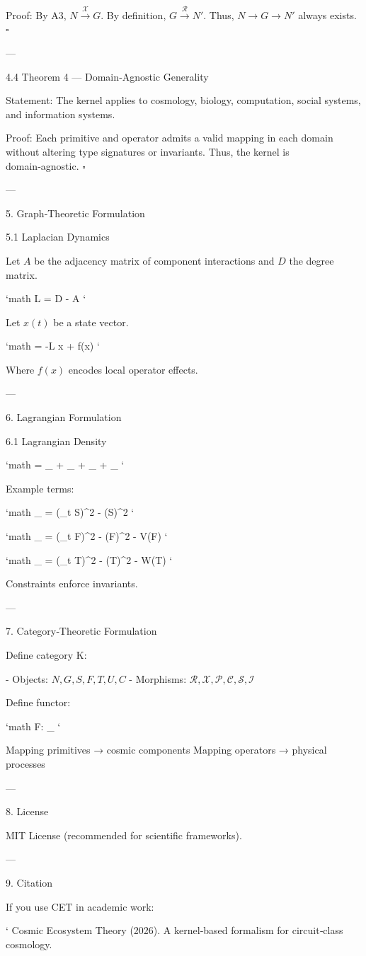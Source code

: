 Proof:  
By A3, \(N \xrightarrow{\mathcal{X}} G\).  
By definition, \(G \xrightarrow{\mathcal{R}} N'\).  
Thus, \(N \rightarrow G \rightarrow N'\) always exists.  
\(\square\)

---

4.4 Theorem 4 — Domain‑Agnostic Generality

Statement:  
The kernel applies to cosmology, biology, computation, social systems, and information systems.

Proof:  
Each primitive and operator admits a valid mapping in each domain without altering type signatures or invariants.  
Thus, the kernel is domain‑agnostic.  
\(\square\)

---

5. Graph‑Theoretic Formulation

5.1 Laplacian Dynamics

Let \(A\) be the adjacency matrix of component interactions and \(D\) the degree matrix.

`math
L = D - A
`

Let \(x(t)\) be a state vector.

`math
 = -L x + f(x)
`

Where \(f(x)\) encodes local operator effects.

---

6. Lagrangian Formulation

6.1 Lagrangian Density

`math
 =
_{}
+
_{}
+
_{}
+
_{}
`

Example terms:

`math
_{} 
= 
 (\partial_t S)^2 
-  (\nabla S)^2
`

`math
_{} 
= 
 (\partial_t F)^2 
-  (\nabla F)^2 
- V(F)
`

`math
_{} 
= 
 (\partial_t T)^2 
-  (\nabla T)^2 
- W(T)
`

Constraints enforce invariants.

---

7. Category‑Theoretic Formulation

Define category K:

- Objects: \(N, G, S, F, T, U, C\)  
- Morphisms: \(\mathcal{R}, \mathcal{X}, \mathcal{P}, \mathcal{C}, \mathcal{S}, \mathcal{I}\)

Define functor:

`math
F:  \rightarrow {}_{}
`

Mapping primitives → cosmic components  
Mapping operators → physical processes

---

8. License

MIT License (recommended for scientific frameworks).

---

9. Citation

If you use CET in academic work:

`
Cosmic Ecosystem Theory (2026).  
A kernel‑based formalism for circuit‑class cosmology.  
